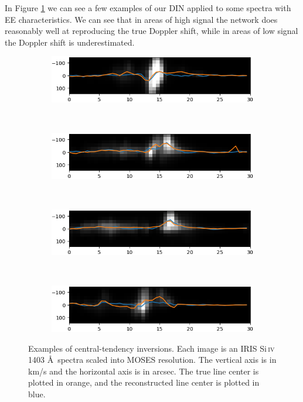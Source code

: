 \documentclass[10pt,letterpaper]{article}
\newcommand{\SiIV}{Si\,\textsc{iv} 1403 \AA\ }
\newcommand{\EE}{\ac{EE} }
\newcommand{\MOSES}{\ac{MOSES} }
\newcommand{\DIN}{\ac{DIN} }
\begin{document}
				In Figure \ref{dopp_ex} we can see a few examples of our \DIN applied to some spectra with \EE characteristics.
				We can see that in areas of high signal the network does reasonably well at reproducing the true Doppler shift, while in areas of low signal the Doppler shift is underestimated.
				
			
				\begin{figure}[h!]
					\centering
					\begin{subfigure}[t]{0.49\textwidth}
						\centering
						\includegraphics[width=\textwidth]{fig/doppler_1182}
					\end{subfigure}
					~ 
					\begin{subfigure}[t]{0.49\textwidth}
						\centering
						\includegraphics[width=\textwidth]{fig/doppler_1225}
					\end{subfigure}
					~ 
					\begin{subfigure}[t]{0.49\textwidth}
						\centering
						\includegraphics[width=\textwidth]{fig/doppler_1263}
					\end{subfigure}
					~ 
					\begin{subfigure}[t]{0.49\textwidth}
						\centering
						\includegraphics[width=\textwidth]{fig/doppler_1343}
					\end{subfigure}
					\caption{Examples of central-tendency inversions. Each image is an IRIS \SiIV spectra scaled into \MOSES resolution. The vertical axis is in km/s and the horizontal axis is in arcsec. The true line center is plotted in orange, and the reconstructed line center is plotted in blue.}
					\label{dopp_ex}
				\end{figure}
\end{document}
